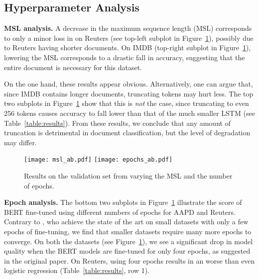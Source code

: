 \documentclass[11pt,a4paper]{article}
\newcommand{\parheader}[1]{{\smallskip \noindent \bf #1.}}
\newcommand{\FOne}{}
\begin{document}
\subsection{Hyperparameter Analysis}

\parheader{MSL analysis}
A decrease in the maximum sequence length (MSL) corresponds to only a minor loss in \FOne{} on Reuters (see top-left subplot in Figure~\ref{fig:ablation}), possibly due to Reuters having shorter documents.
On IMDB (top-right subplot in Figure~\ref{fig:ablation}), lowering the MSL corresponds to a drastic fall in accuracy, suggesting that the entire document is necessary for this dataset.

On the one hand, these results appear obvious.
Alternatively, one can argue that, since IMDB contains longer documents, truncating tokens may hurt less.
The top two subplots in Figure~\ref{fig:ablation} show that this is \textit{not} the case, since truncating to even 256 tokens causes accuracy to fall lower than that of the much smaller LSTM (see Table~\ref{table:results}).
From these results, we conclude that any amount of truncation is detrimental in document classification, but the level of degradation may differ.

\begin{figure}[H]
\centering
\texttt{[image: msl\_ab.pdf]}
\texttt{[image: epochs\_ab.pdf]}
\caption{Results on the validation set from varying the MSL and the number of epochs.}
\label{fig:ablation}
\end{figure}

\parheader{Epoch analysis}
The bottom two subplots in Figure~\ref{fig:ablation} illustrate the \FOne{} score of BERT fine-tuned using different numbers of epochs for AAPD and Reuters.
Contrary to \citet{devlin2018bert}, who achieve the state of the art on small datasets with only a few epochs of fine-tuning, we find that smaller datasets require many more epochs to converge.
On both the datasets (see Figure~\ref{fig:ablation}), we see a significant drop in model quality when the BERT models are fine-tuned for only four epochs, as suggested in the original paper.
On Reuters, using four epochs results in an \FOne{} worse than even logistic regression (Table~\ref{table:results}, row 1).
\end{document}
